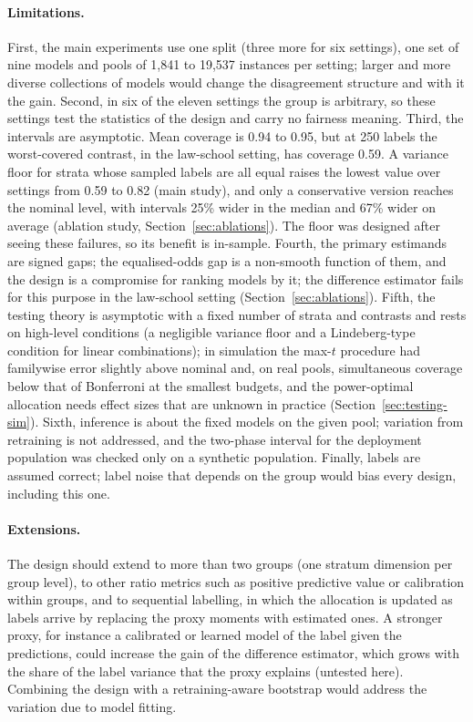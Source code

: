 \paragraph{Limitations.} First, the main experiments use one split (three more for six settings), one set of nine models and pools of 1,841 to 19,537 instances per setting; larger and more diverse collections of models would change the disagreement structure and with it the gain. Second, in six of the eleven settings the group is arbitrary, so these settings test the statistics of the design and carry no fairness meaning. Third, the intervals are asymptotic. Mean coverage is 0.94 to 0.95, but at 250 labels the worst-covered contrast, in the law-school setting, has coverage 0.59. A variance floor for strata whose sampled labels are all equal raises the lowest value over settings from 0.59 to 0.82 (main study), and only a conservative version reaches the nominal level, with intervals 25\% wider in the median and 67\% wider on average (ablation study, Section~\ref{sec:ablations}). The floor was designed after seeing these failures, so its benefit is in-sample. Fourth, the primary estimands are signed gaps; the equalised-odds gap is a non-smooth function of them, and the design is a compromise for ranking models by it; the difference estimator fails for this purpose in the law-school setting (Section~\ref{sec:ablations}). Fifth, the testing theory is asymptotic with a fixed number of strata and contrasts and rests on high-level conditions (a negligible variance floor and a Lindeberg-type condition for linear combinations); in simulation the max-$t$ procedure had familywise error slightly above nominal and, on real pools, simultaneous coverage below that of Bonferroni at the smallest budgets, and the power-optimal allocation needs effect sizes that are unknown in practice (Section~\ref{sec:testing-sim}). Sixth, inference is about the fixed models on the given pool; variation from retraining is not addressed, and the two-phase interval for the deployment population was checked only on a synthetic population. Finally, labels are assumed correct; label noise that depends on the group would bias every design, including this one.

\paragraph{Extensions.} The design should extend to more than two groups (one stratum dimension per group level), to other ratio metrics such as positive predictive value or calibration within groups, and to sequential labelling, in which the allocation is updated as labels arrive by replacing the proxy moments with estimated ones. A stronger proxy, for instance a calibrated or learned model of the label given the predictions, could increase the gain of the difference estimator, which grows with the share of the label variance that the proxy explains (untested here). Combining the design with a retraining-aware bootstrap would address the variation due to model fitting.
